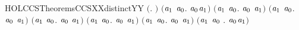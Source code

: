 \newcommand{\HOLCCSTheoremsCCSXXCONDXXCLAUSES}{\UseVerbatim{HOLCCSTheoremsCCSXXCONDXXCLAUSES}}
\begin{SaveVerbatim}{HOLCCSTheoremsCCSXXdistinctYY}
\HOLTokenTurnstile{} \ensuremath{(}\HOLSymConst{\HOLTokenForall{}}.  \HOLSymConst{\HOLTokenNotEqual{}}  \ensuremath{)} \HOLSymConst{\HOLTokenConj{}} \ensuremath{(}\HOLSymConst{\HOLTokenForall{}}\ensuremath{\HOLBoundVar{a}\sb{\mathrm{1}}} \ensuremath{\HOLBoundVar{a}\sb{\mathrm{0}}}.  \HOLSymConst{\HOLTokenNotEqual{}} \ensuremath{\HOLBoundVar{a}\sb{\mathrm{0}}}\HOLSymConst{\ensuremath{\ldotp}}\ensuremath{\HOLBoundVar{a}\sb{\mathrm{1}}}\ensuremath{)} \HOLSymConst{\HOLTokenConj{}}
   \ensuremath{(}\HOLSymConst{\HOLTokenForall{}}\ensuremath{\HOLBoundVar{a}\sb{\mathrm{1}}} \ensuremath{\HOLBoundVar{a}\sb{\mathrm{0}}}.  \HOLSymConst{\HOLTokenNotEqual{}} \ensuremath{\HOLBoundVar{a}\sb{\mathrm{0}}} \HOLSymConst{\ensuremath{+}} \ensuremath{\HOLBoundVar{a}\sb{\mathrm{1}}}\ensuremath{)} \HOLSymConst{\HOLTokenConj{}} \ensuremath{(}\HOLSymConst{\HOLTokenForall{}}\ensuremath{\HOLBoundVar{a}\sb{\mathrm{1}}} \ensuremath{\HOLBoundVar{a}\sb{\mathrm{0}}}.  \HOLSymConst{\HOLTokenNotEqual{}} \ensuremath{\HOLBoundVar{a}\sb{\mathrm{0}}} \HOLSymConst{\ensuremath{\mid}} \ensuremath{\HOLBoundVar{a}\sb{\mathrm{1}}}\ensuremath{)} \HOLSymConst{\HOLTokenConj{}}
   \ensuremath{(}\HOLSymConst{\HOLTokenForall{}}\ensuremath{\HOLBoundVar{a}\sb{\mathrm{1}}} \ensuremath{\HOLBoundVar{a}\sb{\mathrm{0}}}.  \HOLSymConst{\HOLTokenNotEqual{}}  \ensuremath{\HOLBoundVar{a}\sb{\mathrm{0}}} \ensuremath{\HOLBoundVar{a}\sb{\mathrm{1}}}\ensuremath{)} \HOLSymConst{\HOLTokenConj{}} \ensuremath{(}\HOLSymConst{\HOLTokenForall{}}\ensuremath{\HOLBoundVar{a}\sb{\mathrm{1}}} \ensuremath{\HOLBoundVar{a}\sb{\mathrm{0}}}.  \HOLSymConst{\HOLTokenNotEqual{}}  \ensuremath{\HOLBoundVar{a}\sb{\mathrm{0}}} \ensuremath{\HOLBoundVar{a}\sb{\mathrm{1}}}\ensuremath{)} \HOLSymConst{\HOLTokenConj{}}
   \ensuremath{(}\HOLSymConst{\HOLTokenForall{}}\ensuremath{\HOLBoundVar{a}\sb{\mathrm{1}}} \ensuremath{\HOLBoundVar{a}\sb{\mathrm{0}}}.  \HOLSymConst{\HOLTokenNotEqual{}}  \ensuremath{\HOLBoundVar{a}\sb{\mathrm{0}}} \ensuremath{\HOLBoundVar{a}\sb{\mathrm{1}}}\ensuremath{)} \HOLSymConst{\HOLTokenConj{}} \ensuremath{(}\HOLSymConst{\HOLTokenForall{}}\ensuremath{\HOLBoundVar{a}\sb{\mathrm{1}}} \ensuremath{\HOLBoundVar{a}\sb{\mathrm{0}}} .   \HOLSymConst{\HOLTokenNotEqual{}} \ensuremath{\HOLBoundVar{a}\sb{\mathrm{0}}}\HOLSymConst{\ensuremath{\ldotp}}\ensuremath{\HOLBoundVar{a}\sb{\mathrm{1}}}\ensuremath{)} \HOLSymConst{\HOLTokenConj{}}

\end{SaveVerbatim}
